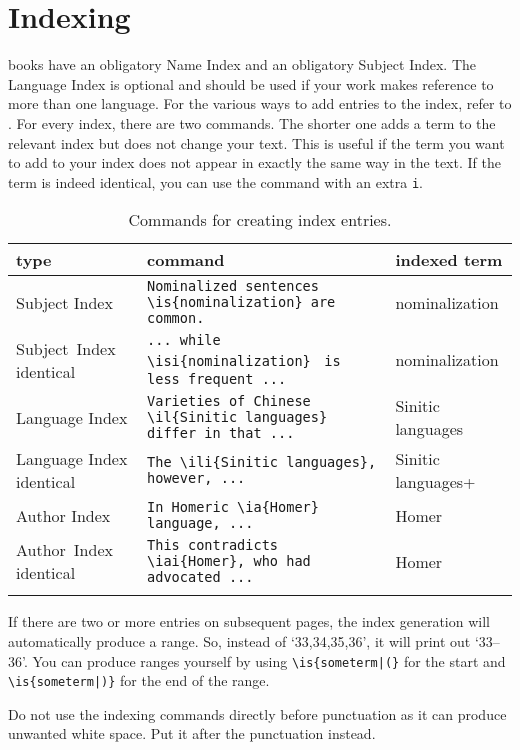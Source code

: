 \chapter{Indexing}
\lsp books have an obligatory Name Index and an obligatory Subject Index. The Language Index is optional and should be used if your work makes reference to more than one language. 
For the various ways to add entries to the index, refer to . For every index, there are two commands. The shorter one adds a term to the relevant index but does not change your text. This is useful if the term you want to add to your index does not appear in exactly the same way in the text. If the term is indeed identical, you can use the command with an extra \verb+i+.

\begin{table}[h]
\caption{Commands for creating index entries.}
\label{tab:latex:indexentriese}
 \begin{tabular}{p{2.5cm}>{\small\raggedright}p{6.5cm}l}
  \lsptoprule
  type & \rm\normalsize command & indexed term \\
  \midrule
  Subject Index& \verb+Nominalized sentences+ \verb+\is{nominalization} are+ \verb+common.+ & nomina\-lization \\
  \mbox{Subject Index} identical& \verb+... while \isi{nominalization}+ \verb+ is less frequent ...+  & nomina\-lization \\[2em]
  Language Index & \verb+Varieties of Chinese+ \verb+\il{Sinitic languages}+ \verb+differ in that ...+ & Sinitic languages \\
  Language Index identical& \verb+The \ili{Sinitic languages},+ \verb+however, ... + & Sinitic languages+ \\[2em]
  Author Index & \verb+In Homeric \ia{Homer}+ \verb+language, ... + & Homer\\
  \mbox{Author Index} identical & \verb+This contradicts+ \verb+\iai{Homer}, who had+ \verb+advocated ...+ & Homer \\
  \lspbottomrule
 \end{tabular}
\end{table}

If there are two or more entries on subsequent pages, the index generation will automatically produce a range. So, instead of `33,34,35,36', it will print out `33--36'. You can produce ranges yourself by using \verb+\is{someterm|(}+ for the start and  \verb+\is{someterm|)}+ for the end of the range. 

Do not use the indexing commands directly before punctuation as it can produce unwanted white space. Put it after the punctuation instead.

